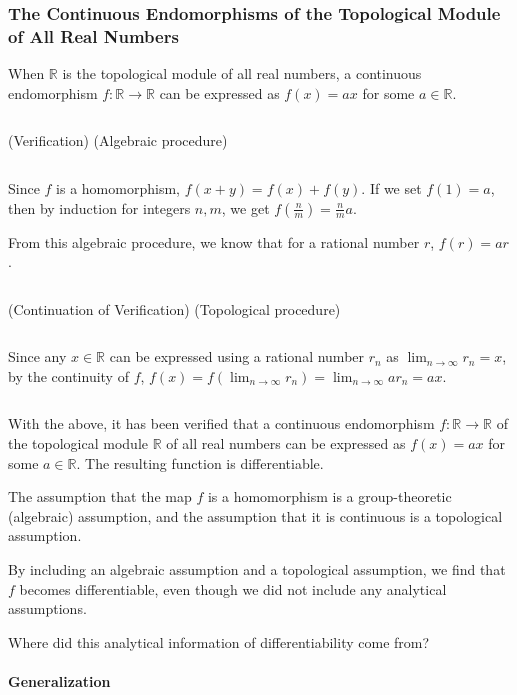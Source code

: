 \documentclass[uplatex,a4j,12pt,dvipdfmx]{jsarticle}
\begin{document}
\subsubsection{The Continuous Endomorphisms of the Topological Module of All Real Numbers}

When $\mathbb{R}$ is the topological module of all real numbers,
a continuous endomorphism
$f: \mathbb{R} \to \mathbb{R}$
can be expressed as $f(x) = ax$ for some $a \in \mathbb{R}$.

	${}$

(Verification) (Algebraic procedure)

${}$

Since $f$ is a homomorphism, $f(x+y)=f(x)+f(y)$.
If we set $f(1)=a$, then by induction for integers $n,m$,
we get $f(\frac{n}{m}) = \frac{n}{m} a$.

From this algebraic procedure, we know that for a rational number $r$, $f(r) = ar$.

	${}$

(Continuation of Verification) (Topological procedure)

${}$

Since any $x \in \mathbb{R}$ can be expressed using a rational number $r_{n}$ as
$\displaystyle \lim_{n \to \infty} r_{n} = x$,
by the continuity of $f$,
$\displaystyle f(x) = f( \lim_{n \to \infty} r_{n}) = \lim_{n \to \infty} a r_{n} = ax$.

	${}$

With the above, it has been verified that a continuous endomorphism
$f: \mathbb{R} \to \mathbb{R}$
of the topological module $\mathbb{R}$ of all real numbers can be expressed as $f(x) = ax$ for some $a \in \mathbb{R}$.
The resulting function is differentiable.

The assumption that the map $f$ is a homomorphism is a group-theoretic (algebraic) assumption,
and the assumption that it is continuous is a topological assumption.

By including an algebraic assumption and a topological assumption, we find that $f$ becomes differentiable, even though we did not include any analytical assumptions.

Where did this analytical information of differentiability come from?

\paragraph{Generalization}

${}$
\end{document}
